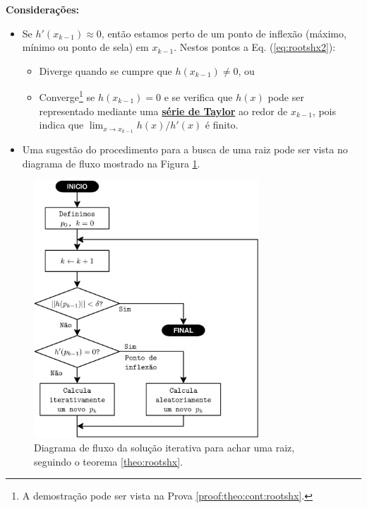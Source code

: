 \begin{theorem}
\textbf{Considerações:}
\begin{itemize} 
\item Se $h'(x_{k-1})\approx 0$, então estamos perto de um ponto de inflexão 
(máximo, mínimo ou ponto de sela) em $x_{k-1}$. Nestos pontos a Eq. (\ref{eq:rootshx2}): 
\begin{itemize}
\item Diverge quando se cumpre que $h(x_{k-1})\neq 0$, ou
\item Converge\footnote{A demostração pode ser vista na Prova \ref{proof:theo:cont:rootshx}.} 
se $h(x_{k-1}) = 0$ e se verifica que $h(x)$ pode ser representado 
mediante uma \hyperref[def:taylor]{\textbf{série de Taylor}} ao redor de $x_{k-1}$, 
 pois indica que $\lim_{x\rightarrow x_{k-1}}  h(x)/h'(x)$ é finito.
\end{itemize}
\item Uma sugestão do procedimento para a busca de uma raiz pode ser vista no diagrama de fluxo
mostrado na Figura \ref{fig:fluxorhx1}. 
\end{itemize}
\end{theorem}

\begin{figure}[!h]
     \centering
         \includegraphics[width=0.75\textwidth]{chapters/roots/fluxo1.eps}
        \caption{Diagrama de fluxo da solução iterativa para achar uma raiz, seguindo o teorema \ref{theo:rootshx}.}
        \label{fig:fluxorhx1}
\end{figure}

